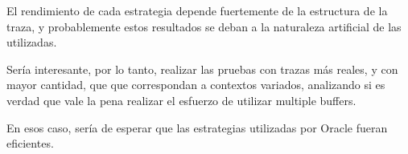 \vspace*{0.5cm}

El rendimiento de cada estrategia depende fuertemente de la 
estructura de la traza, y probablemente estos resultados se 
deban a la naturaleza artificial de las utilizadas. 

\vspace*{0.5cm}

Sería interesante, por lo tanto, realizar las pruebas con 
trazas más reales, y con mayor cantidad, que que correspondan 
a contextos variados, analizando si es verdad que vale la pena
realizar el esfuerzo de utilizar multiple buffers.

\vspace*{0.5cm}

En esos caso, sería de esperar que las estrategias utilizadas
por Oracle fueran eficientes.

